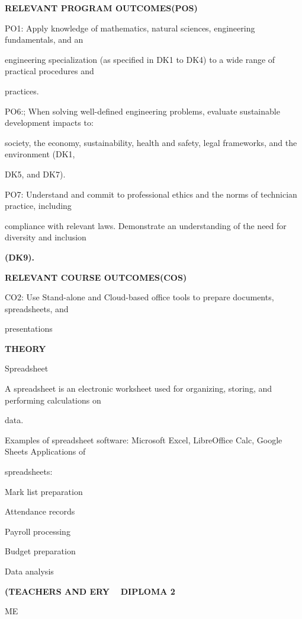 \documentclass[10pt,a4paper]{article}
\begin{document}
\medskip\noindent\textbf{RELEVANT PROGRAM OUTCOMES(POS)}\par
\noindent PO1: Apply knowledge of mathematics, natural sciences, engineering fundamentals, and an\par
\noindent engineering specialization (as specified in DK1 to DK4) to a wide range of practical procedures and\par
\noindent practices.\par
\noindent PO6:; When solving well-defined engineering problems, evaluate sustainable development impacts to:\par
\noindent society, the economy, sustainability, health and safety, legal frameworks, and the environment (DK1,\par
\noindent DK5, and DK7).\par
\noindent PO7: Understand and commit to professional ethics and the norms of technician practice, including\par
\noindent compliance with relevant laws. Demonstrate an understanding of the need for diversity and inclusion\par
\medskip\noindent\textbf{(DK9).}\par

\medskip\noindent\textbf{RELEVANT COURSE OUTCOMES(COS)}\par
\noindent CO2: Use Stand-alone and Cloud-based office tools to prepare documents, spreadsheets, and\par
\noindent presentations\par

\medskip\noindent\textbf{THEORY}\par
\noindent Spreadsheet\par
\noindent A spreadsheet is an electronic worksheet used for organizing, storing, and performing calculations on\par
\noindent data.\par
\noindent Examples of spreadsheet software: Microsoft Excel, LibreOffice Calc, Google Sheets Applications of\par
\noindent spreadsheets:\par
\noindent Mark list preparation\par
\noindent Attendance records\par
\noindent\textbullet\; Payroll processing\par
\noindent Budget preparation\par
\noindent Data analysis\par
\medskip\noindent\textbf{(TEACHERS AND ERY ~ DIPLOMA 2}\par
\noindent ME\par
\end{document}
